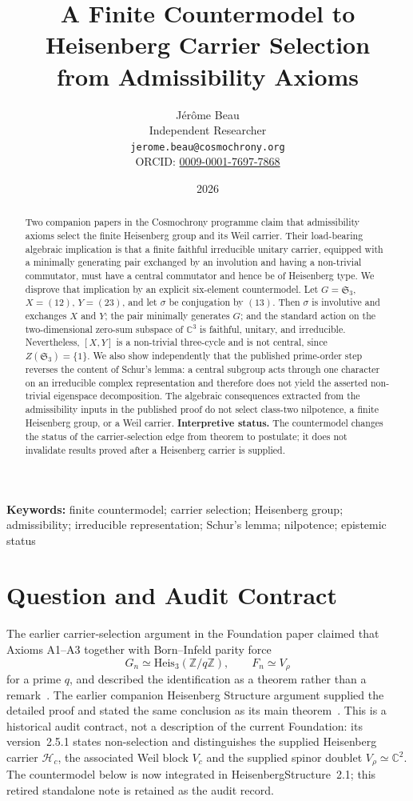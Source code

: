 \documentclass[11pt,a4paper]{article}
\title{A Finite Countermodel to Heisenberg Carrier Selection\\
from Admissibility Axioms}
\author{J\'er\^ome Beau\\
\small Independent Researcher\\
\small \texttt{jerome.beau@cosmochrony.org}\\
\small ORCID: \href{https://orcid.org/0009-0001-7697-7868}{0009-0001-7697-7868}}
\date{2026}
\newcommand{\Heis}{\mathrm{Heis}_3}
\newcommand{\Sym}{\mathfrak{S}}
\begin{document}
\maketitle

\begin{abstract}
Two companion papers in the Cosmochrony programme claim that admissibility axioms select the finite
Heisenberg group and its Weil carrier.
Their load-bearing algebraic implication is that a finite faithful irreducible unitary carrier, equipped
with a minimally generating pair exchanged by an involution and having a non-trivial commutator, must have
a central commutator and hence be of Heisenberg type.
We disprove that implication by an explicit six-element countermodel.
Let \(G=\Sym_3\), \(X=(12)\), \(Y=(23)\), and let \(\sigma\) be conjugation by \((13)\).
Then \(\sigma\) is involutive and exchanges \(X\) and \(Y\); the pair minimally generates \(G\); and the
standard action on the two-dimensional zero-sum subspace of \(\mathbb{C}^3\) is faithful, unitary, and
irreducible.
Nevertheless, \([X,Y]\) is a non-trivial three-cycle and is not central, since \(Z(\Sym_3)=\{1\}\).
We also show independently that the published prime-order step reverses the content of Schur's lemma:
a central subgroup acts through one character on an irreducible complex representation and therefore does
not yield the asserted non-trivial eigenspace decomposition.
The algebraic consequences extracted from the admissibility inputs in the published proof do not select
class-two nilpotence, a finite Heisenberg group, or a Weil carrier.
\textbf{Interpretive status.}
The countermodel changes the status of the carrier-selection edge from theorem to postulate; it does not
invalidate results proved after a Heisenberg carrier is supplied.
\end{abstract}

\noindent\textbf{Keywords:}
finite countermodel; carrier selection; Heisenberg group; admissibility; irreducible representation;
Schur's lemma; nilpotence; epistemic status

\clearpage
\tableofcontents

\clearpage
\section{Question and Audit Contract}
\label{sec:contract}

The earlier carrier-selection argument in the Foundation paper claimed that Axioms A1--A3
together with Born--Infeld parity force
\[
G_n \simeq \Heis(\mathbb{Z}/q\mathbb{Z}),
\qquad
F_n \simeq V_\rho
\]
for a prime \(q\), and described the identification as a theorem rather than a
remark~\cite{Beau2026Foundation}.
The earlier companion Heisenberg Structure argument supplied the detailed proof and stated the same
conclusion as its main theorem~\cite{Beau2026HeisenbergStructure}.
This is a historical audit contract, not a description of the current Foundation: its version~2.5.1
states non-selection and distinguishes the supplied Heisenberg carrier $\mathcal{H}_c$, the associated
Weil block $V_c$ and the supplied spinor doublet $V_\rho \simeq \mathbb{C}^2$.
The countermodel below is now integrated in HeisenbergStructure~2.1; this retired standalone note is
retained as the audit record.
\end{document}
